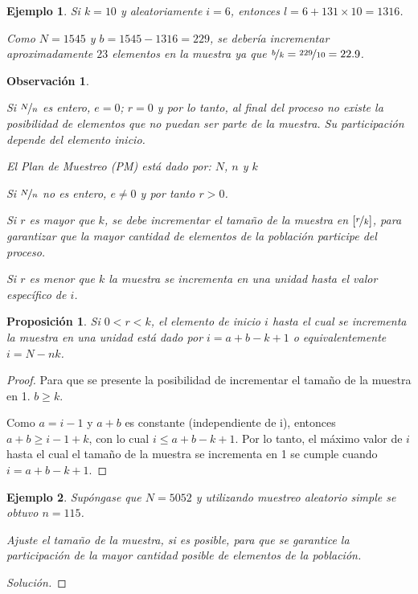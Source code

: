\documentclass[a5paper,doc,10pt,noapacite]{apa6}
\newtheorem{proposicion}{Proposición}
\newtheorem{observ}{Observación}
\newtheorem{ejem}{Ejemplo}
\begin{document}
{{\begin{ejem}
	Si \(k=10\) y aleatoriamente \(i=6\), entonces \(l=6+131 \times 10=1316\).
	
	Como \(N=1545\) y \(b=1545-1316=229\), se debería incrementar  aproximadamente \(23\) elementos en la muestra ya que \(\nicefrac{b}{k}=\nicefrac{229}{10}=22.9\).
\end{ejem}

\begin{observ}\quad
	\begin{APAenumerate}
		\item Si \(\nicefrac{N}{n}\) es entero, \(e=0\); \(r=0\) y por lo tanto, al final del proceso no existe la posibilidad de elementos que no puedan ser parte de la muestra. Su participación depende del elemento inicio.
		
		El Plan de Muestreo (PM) está dado por: \(N\), \(n\) y \(k\)
		
		\item Si \(\nicefrac{N}{n}\) no es entero, \(e\neq 0\) y por tanto \(r>0\).
		
		Si \(r\) es mayor que \(k\), se debe incrementar el tamaño de la muestra en \(\left[\nicefrac{r}{k}\right]\), para garantizar que la mayor cantidad de elementos de la población participe del proceso.
		
		Si \(r\) es menor que \(k\) la muestra se incrementa en una unidad hasta el valor específico de \(i\).	
	\end{APAenumerate}
\end{observ}

\begin{proposicion}\label{prop-6.2}
	Si \(0<r<k\), el elemento de inicio \(i\) hasta el cual se incrementa la muestra en una unidad está dado por \(i=a+b-k+1\) o equivalentemente \(i=N-nk\).
\end{proposicion}
\begin{proof}
	Para que se presente la posibilidad de incrementar el tamaño de la muestra en 1. \(b\geq k\). 
	
	Como \(a=i-1\) y \(a+b\) es constante (independiente de i), entonces \(a+b\geq i-1+k\), con lo cual \(i\leq a+b-k+1\). Por lo tanto, el máximo valor de \(i\) hasta el cual el tamaño de la muestra se incrementa en 1 se cumple cuando \(i=a+b-k+1\).
\end{proof}

\begin{ejem}\label{ejem-6.2}
	Supóngase que \(N=5052\) y utilizando muestreo aleatorio simple se obtuvo \(n=115\).
	
	
	Ajuste el tamaño de la muestra, si es posible, para que se garantice la participación de la mayor cantidad posible de elementos de la población.
\end{ejem}
\begin{proof}[Solución]\quad


\end{proof}}}
\end{document}
